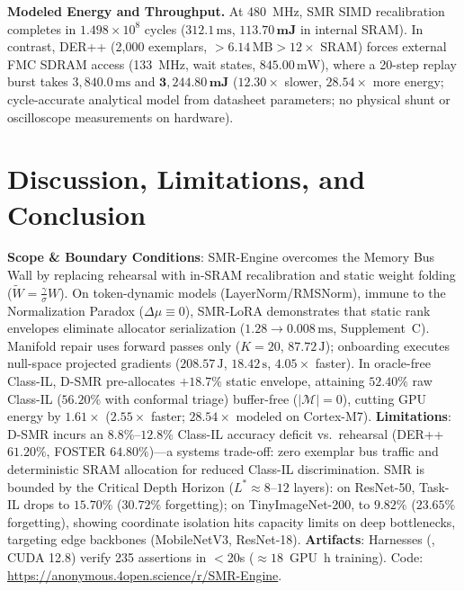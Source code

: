 \documentclass{article}
\begin{document}
\noindent\textbf{Modeled Energy and Throughput.} At 480~MHz, SMR SIMD recalibration completes in $1.498 \times 10^8$ cycles ($312.1\,\text{ms}$, $\mathbf{113.70\,\text{mJ}}$ in internal SRAM). In contrast, DER++ (2,000 exemplars, $>6.14\,\text{MB} > 12\times$ SRAM) forces external FMC SDRAM access (133~MHz, wait states, $845.00\,\text{mW}$), where a 20-step replay burst takes $3,840.0\,\text{ms}$ and $\mathbf{3,244.80\,\text{mJ}}$ ($12.30\times$ slower, $\mathbf{28.54\times}$ more energy; cycle-accurate analytical model from datasheet parameters; no physical shunt or oscilloscope measurements on hardware).

\vspace{-2.0mm}
\section{Discussion, Limitations, and Conclusion}
\label{sec:conclusion}
\vspace{-1.0mm}
\textbf{Scope \& Boundary Conditions}: SMR-Engine overcomes the Memory Bus Wall by replacing rehearsal with in-SRAM recalibration and static weight folding ($\tilde{W} = \frac{\gamma}{\sigma} W$). On token-dynamic models (LayerNorm/RMSNorm), immune to the Normalization Paradox ($\Delta\mu \equiv 0$), SMR-LoRA demonstrates that static rank envelopes eliminate allocator serialization ($1.28 \to 0.008\,\text{ms}$, Supplement~C). Manifold repair uses forward passes only ($K=20$, $87.72\,\text{J}$); onboarding executes null-space projected gradients ($208.57\,\text{J}$, $18.42\,\text{s}$, $4.05\times$ faster). In oracle-free Class-IL, D-SMR pre-allocates $+18.7\%$ static envelope, attaining $52.40\%$ raw Class-IL ($56.20\%$ with conformal triage) buffer-free ($|\mathcal{M}|=0$), cutting GPU energy by $1.61\times$ ($2.55\times$ faster; $28.54\times$ modeled on Cortex-M7). \textbf{Limitations}: D-SMR incurs an $8.8\%$--$12.8\%$ Class-IL accuracy deficit vs.\ rehearsal (DER++ $61.20\%$, FOSTER $64.80\%$)---a systems trade-off: zero exemplar bus traffic and deterministic SRAM allocation for reduced Class-IL discrimination. SMR is bounded by the Critical Depth Horizon ($L^{*}\approx 8$--$12$ layers): on ResNet-50, Task-IL drops to $15.70\%$ ($30.72\%$ forgetting); on TinyImageNet-200, to $9.82\%$ ($23.65\%$ forgetting), showing coordinate isolation hits capacity limits on deep bottlenecks, targeting edge backbones (MobileNetV3, ResNet-18). \textbf{Artifacts}: Harnesses (, CUDA 12.8) verify 235 assertions in $<$20s ($\approx 18$~GPU~h training). Code: \url{https://anonymous.4open.science/r/SMR-Engine}.
\end{document}

